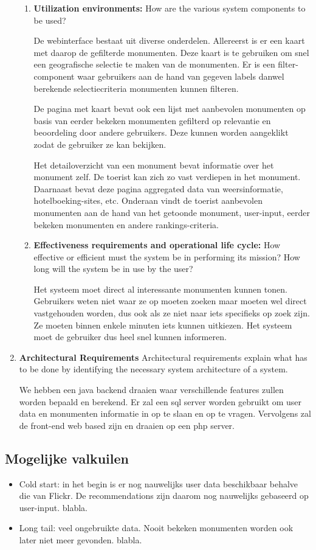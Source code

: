 \documentclass{article}
\begin{document}
\begin{enumerate}
\begin{enumerate}
		\item{\textbf{Utilization environments:}} How are the various system components to be used?
		
		De webinterface bestaat uit diverse onderdelen. Allereerst is er een kaart met daarop de gefilterde monumenten. Deze kaart is te gebruiken om snel een geografische selectie te maken van de monumenten. Er is een filter-component waar gebruikers aan de hand van gegeven labels danwel berekende selectiecriteria monumenten kunnen filteren. 
		
		De pagina met kaart bevat ook een lijst met aanbevolen monumenten op basis van eerder bekeken monumenten gefilterd op relevantie en beoordeling door andere gebruikers. Deze kunnen worden aangeklikt zodat de gebruiker ze kan bekijken.
		
		Het detailoverzicht van een monument bevat informatie over het monument zelf. De toerist kan zich zo vast verdiepen in het monument. Daarnaast bevat deze pagina aggregated data van weersinformatie, hotelboeking-sites, etc. Onderaan vindt de toerist aanbevolen monumenten aan de hand van het getoonde monument, user-input, eerder bekeken monumenten en andere rankings-criteria.
		
		\item{\textbf{Effectiveness requirements and operational life cycle:}} How effective or efficient must the system be in performing its mission? How long will the system be in use by the user?
		
		Het systeem moet direct al interessante monumenten kunnen tonen. Gebruikers weten niet waar ze op moeten zoeken maar moeten wel direct vastgehouden worden, dus ook als ze niet naar iets specifieks op zoek zijn. Ze moeten binnen enkele minuten iets kunnen uitkiezen. Het systeem moet de gebruiker dus heel snel kunnen informeren.
	\end{enumerate}
	\item{\textbf{Architectural Requirements}}
	Architectural requirements explain what has to be done by identifying the necessary system architecture of a system.
 
We hebben een java backend draaien waar verschillende features zullen worden bepaald en berekend. Er zal een sql server worden gebruikt om user data en monumenten informatie in op te slaan en op te vragen. Vervolgens zal de front-end web based zijn en draaien op een php server.
	
\end{enumerate}
\subsection{Mogelijke valkuilen}
\begin{itemize}
\item Cold start: in het begin is er nog nauwelijks user data beschikbaar behalve die van Flickr. De recommendations zijn daarom nog nauwelijks gebaseerd op user-input. blabla.
\item Long tail: veel ongebruikte data. Nooit bekeken monumenten worden ook later niet meer gevonden. blabla.
\end{itemize}
\end{document}
